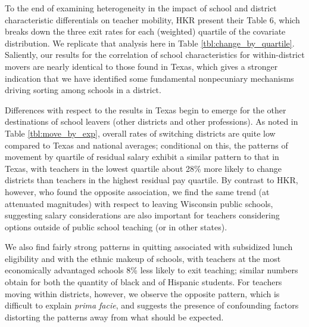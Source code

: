 To the end of examining heterogeneity in the impact of school and
district characteristic differentials on teacher mobility, HKR present
their Table 6, which breaks down the three exit rates for each
(weighted) quartile of the covariate distribution. We replicate that
analysis here in Table \ref{tbl:change_by_quartile}. Saliently, our
results for the correlation of school characteristics for
within-district movers are nearly identical to those found in Texas,
which gives a stronger indication that we have identified some
fundamental nonpecuniary mechanisms driving sorting among schools in a
district.

Differences with respect to the results in Texas begin to emerge for the
other destinations of school leavers (other districts and other
professions). As noted in Table \ref{tbl:move_by_exp}, overall rates of
switching districts are quite low compared to Texas and national
averages; conditional on this, the patterns of movement by quartile of
residual salary exhibit a similar pattern to that in Texas, with
teachers in the lowest quartile about 28\% more likely to change
districts than teachers in the highest residual pay quartile. By
contrast to HKR, however, who found the opposite association, we find
the same trend (at attenuated magnitudes) with respect to leaving
Wisconsin public schools, suggesting salary considerations are also
important for teachers considering options outside of public school
teaching (or in other states).

We also find fairly strong patterns in quitting associated with
subsidized lunch eligibility and with the ethnic makeup of schools, with
teachers at the most economically advantaged schools 8\% less likely to
exit teaching; similar numbers obtain for both the quantity of black and
of Hispanic students. For teachers moving within districts, however, we
observe the opposite pattern, which is difficult to explain \emph{prima
facie}, and suggests the presence of confounding factors distorting the
patterns away from what should be expected.

